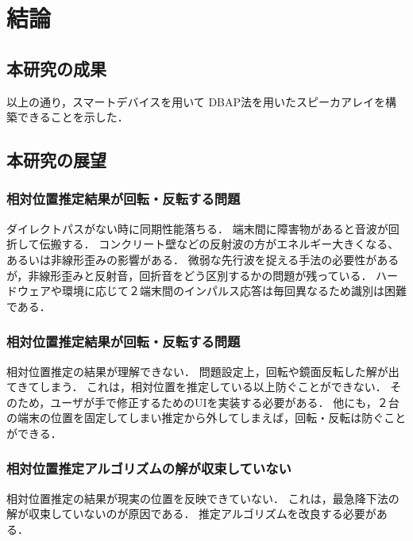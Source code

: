 \chapter{結論}
\section{本研究の成果}

以上の通り，スマートデバイスを用いて
DBAP法を用いたスピーカアレイを構築できることを示した．


\section{本研究の展望}

\subsection{相対位置推定結果が回転・反転する問題}



ダイレクトパスがない時に同期性能落ちる．
端末間に障害物があると音波が回折して伝搬する．
コンクリート壁などの反射波の方がエネルギー大きくなる、あるいは非線形歪みの影響がある\cite{nonlinear}．
微弱な先行波を捉える手法の必要性があるが，非線形歪みと反射音，回折音をどう区別するかの問題が残っている．
ハードウェアや環境に応じて２端末間のインパルス応答は毎回異なるため識別は困難である．


\subsection{相対位置推定結果が回転・反転する問題}

相対位置推定の結果が理解できない．
問題設定上，回転や鏡面反転した解が出てきてしまう．
これは，相対位置を推定している以上防ぐことができない．
そのため，ユーザが手で修正するためのUIを実装する必要がある．
他にも，２台の端末の位置を固定してしまい推定から外してしまえば，回転・反転は防ぐことができる．


\subsection{相対位置推定アルゴリズムの解が収束していない}

相対位置推定の結果が現実の位置を反映できていない．
これは，最急降下法の解が収束していないのが原因である．
推定アルゴリズムを改良する必要がある．


